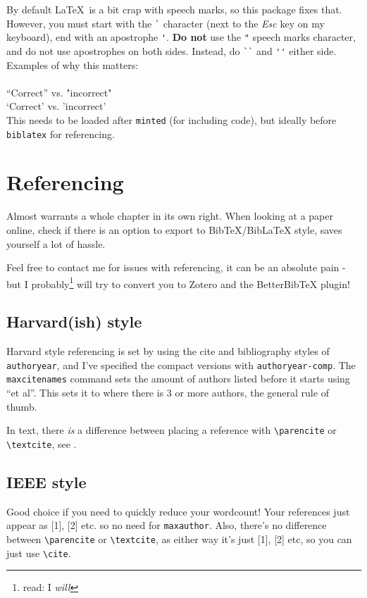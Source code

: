 \documentclass[../main]{subfiles}
\begin{document}
By default \LaTeX\ is a bit crap with speech marks, so this package fixes that. However, you must start with the \verb|`| character (next to the \emph{Esc} key on my keyboard), end with an apostrophe \verb|'|. \textbf{Do not} use the \verb|"| speech marks character, and do not use apostrophes on both sides. Instead, do \verb|``| and \verb|''| either side. Examples of why this matters:\\
\\
\noindent``Correct'' vs. "incorrect"\\
`Correct' vs. 'incorrect'\\

This needs to be loaded after \texttt{minted} (for including code), but ideally before \texttt{biblatex} for referencing.

\section{Referencing}

Almost warrants a whole chapter in its own right. 
When looking at a paper online, check if there is an option to export to BibTeX/BibLaTeX style, saves yourself a lot of hassle. 

Feel free to contact me for issues with referencing, it can be an absolute pain - but I probably\footnote{read: I \textit{will}} will try to convert you to Zotero and the BetterBibTeX plugin! 

\subsection{Harvard(ish) style}

Harvard style referencing is set by using the cite and bibliography styles of \texttt{authoryear}, and I've specified the compact versions with \texttt{authoryear-comp}. The \texttt{maxcitenames} command sets the amount of authors listed before it starts using ``et al''. This sets it to where there is 3 or more authors, the general rule of thumb.

In text, there \textit{is} a difference between placing a reference with \verb|\parencite| or \verb|\textcite|, see .

\subsection{IEEE style}

Good choice if you need to quickly reduce your wordcount! Your references just appear as [1], [2] etc. so no need for \texttt{maxauthor}. Also, there's no difference between \verb|\parencite| or \verb|\textcite|, as either way it's just [1], [2] etc, so you can just use \verb|\cite|.
\end{document}
